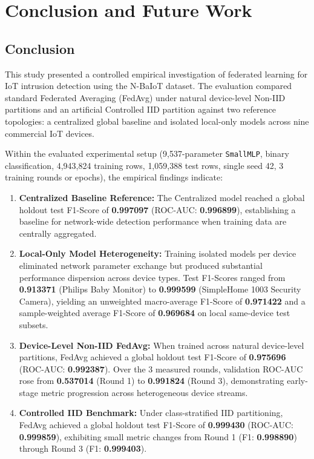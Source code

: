 \documentclass[11pt,a4paper]{article}
\begin{document}
\section{Conclusion and Future Work}

\subsection{Conclusion}
This study presented a controlled empirical investigation of federated learning for IoT intrusion detection using the N-BaIoT dataset. The evaluation compared standard Federated Averaging (FedAvg) under natural device-level Non-IID partitions and an artificial Controlled IID partition against two reference topologies: a centralized global baseline and isolated local-only models across nine commercial IoT devices.

Within the evaluated experimental setup (9,537-parameter \texttt{SmallMLP}, binary classification, 4,943,824 training rows, 1,059,388 test rows, single seed 42, 3 training rounds or epochs), the empirical findings indicate:

\begin{enumerate}
    \item \textbf{Centralized Baseline Reference:} The Centralized model reached a global holdout test F1-Score of \textbf{0.997097} (ROC-AUC: \textbf{0.996899}), establishing a baseline for network-wide detection performance when training data are centrally aggregated.
    \item \textbf{Local-Only Model Heterogeneity:} Training isolated models per device eliminated network parameter exchange but produced substantial performance dispersion across device types. Test F1-Scores ranged from \textbf{0.913371} (Philips Baby Monitor) to \textbf{0.999599} (SimpleHome 1003 Security Camera), yielding an unweighted macro-average F1-Score of \textbf{0.971422} and a sample-weighted average F1-Score of \textbf{0.969684} on local same-device test subsets.
    \item \textbf{Device-Level Non-IID FedAvg:} When trained across natural device-level partitions, FedAvg achieved a global holdout test F1-Score of \textbf{0.975696} (ROC-AUC: \textbf{0.992387}). Over the 3 measured rounds, validation ROC-AUC rose from \textbf{0.537014} (Round 1) to \textbf{0.991824} (Round 3), demonstrating early-stage metric progression across heterogeneous device streams.
    \item \textbf{Controlled IID Benchmark:} Under class-stratified IID partitioning, FedAvg achieved a global holdout test F1-Score of \textbf{0.999430} (ROC-AUC: \textbf{0.999859}), exhibiting small metric changes from Round 1 (F1: \textbf{0.998890}) through Round 3 (F1: \textbf{0.999403}).
\end{enumerate}
\end{document}

